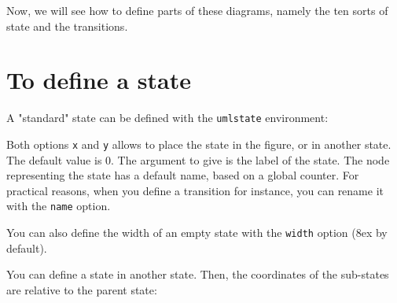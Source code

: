 \documentclass[a4paper,11pt]{report}
\begin{document}
\begin{center}
\end{center}

Now, we will see how to define parts of these diagrams, namely the ten sorts of state and the transitions.

\newpage

\section{To define a state}\label{s.state}

A "standard" state can be defined with the {\tt umlstate} environment:

\medskip

\begin{minipage}{0.51\textwidth}
	
\end{minipage}
\begin{minipage}{0.49\textwidth}
	\begin{center}
	\end{center}
\end{minipage}

\medskip

Both options {\tt x} and {\tt y} allows to place the state in the figure, or in another state.
The default value is 0. The argument to give is the label of the state. The node representing the state has a default name, based on a global counter.
For practical reasons, when you define a transition for instance, you can rename it with the {\tt name} option.

\medskip

You can also define the width of an empty state with the  {\tt width} option (8ex by default).

\medskip

You can define a state in another state. Then, the coordinates of the sub-states are relative to the parent state:

\medskip

\begin{minipage}{0.51\textwidth}
	
\end{minipage}
\begin{minipage}{0.49\textwidth}
	\begin{center}
	\end{center}
\end{minipage}
\end{document}
